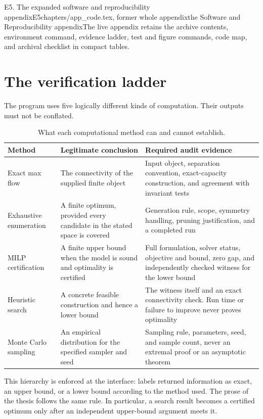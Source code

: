 \begin{offcut}{E5. The expanded software and reproducibility appendix}{E5}{chapters/app\_code.tex, former whole appendix}{the Software and Reproducibility appendix}{The live appendix retains the archive contents, environment command, evidence ladder, test and figure commands, code map, and archival checklist in compact tables.}
\section{The verification ladder}

The program uses five logically different kinds of computation. Their outputs must not be conflated.

\begin{table}[ht]
  \centering
  \small
  \begin{tabularx}{\textwidth}{@{}>{\raggedright\arraybackslash}p{}>{\raggedright\arraybackslash}p{}>{\raggedright\arraybackslash}X@{}}
    \toprule
    Method & Legitimate conclusion & Required audit evidence \\
    \midrule
    Exact max flow & The connectivity of the supplied finite object & Input object, separation convention, exact-capacity construction, and agreement with invariant tests \\
    Exhaustive enumeration & A finite optimum, provided every candidate in the stated space is covered & Generation rule, scope, symmetry handling, pruning justification, and a completed run \\
    MILP certification & A finite upper bound when the model is sound and optimality is certified & Full formulation, solver status, objective and bound, zero gap, and independently checked witness for the lower bound \\
    Heuristic search & A concrete feasible construction and hence a lower bound & The witness itself and an exact connectivity check. Run time or failure to improve never proves optimality \\
    Monte Carlo sampling & An empirical distribution for the specified sampler and seed & Sampling rule, parameters, seed, and sample count, never an extremal proof or an asymptotic theorem \\
    \bottomrule
  \end{tabularx}
  \caption{What each computational method can and cannot establish.}
\end{table}

This hierarchy is enforced at the interface:  labels returned information as exact, an upper bound, or a lower bound according to the method used. The prose of the thesis follows the same rule. In particular, a search result becomes a certified optimum only after an independent upper-bound argument meets it.


\end{offcut}
